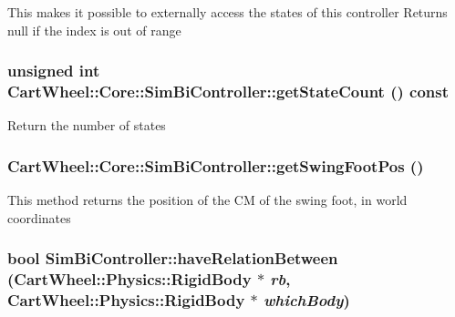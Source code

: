 This makes it possible to externally access the states of this controller Returns null if the index is out of range \hypertarget{classCartWheel_1_1Core_1_1SimBiController_a2b05d22bddc05a5e1653041ff1543228}{
\subsubsection[{getStateCount}]{\setlength{\rightskip}{0pt plus 5cm}unsigned int CartWheel::Core::SimBiController::getStateCount () const}}
\label{classCartWheel_1_1Core_1_1SimBiController_a2b05d22bddc05a5e1653041ff1543228}
Return the number of states \hypertarget{classCartWheel_1_1Core_1_1SimBiController_a628d9290279d83b8cf8bb3784ae6a73b}{
\subsubsection[{getSwingFootPos}]{ CartWheel::Core::SimBiController::getSwingFootPos ()}}
\label{classCartWheel_1_1Core_1_1SimBiController_a628d9290279d83b8cf8bb3784ae6a73b}
This method returns the position of the CM of the swing foot, in world coordinates \hypertarget{classCartWheel_1_1Core_1_1SimBiController_a13618b2a089465535686d18e58856a08}{
\subsubsection[{haveRelationBetween}]{\setlength{\rightskip}{0pt plus 5cm}bool SimBiController::haveRelationBetween ({\bf CartWheel::Physics::RigidBody} $\ast$ {\em rb}, \/  {\bf CartWheel::Physics::RigidBody} $\ast$ {\em whichBody})}}
